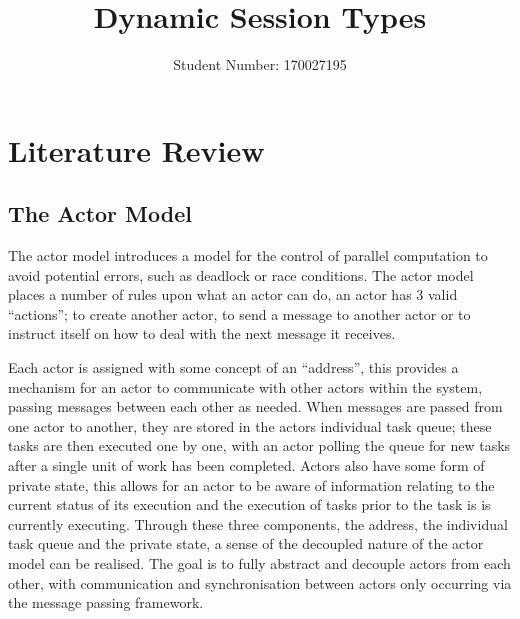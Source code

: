 \documentclass{article}
\author{Student Number: 170027195}
\title{Dynamic Session Types}
\begin{document}
	\maketitle
	\pagebreak
	\tableofcontents
	\pagebreak
	\section{Literature Review}
	\subsection{The Actor Model}
	The actor model introduces a model for the control of parallel computation to avoid potential errors, such as deadlock or race conditions. The actor model places a number of rules upon what an actor can do, an actor has 3 valid “actions”; to create another actor, to send a message to another actor or to instruct itself on how to deal with the next message it receives.
	
	Each actor is assigned with some concept of an “address”, this provides a mechanism for an actor to communicate with other actors within the system, passing messages between each other as needed. When messages are passed from one actor to another, they are stored in the actors individual task queue; these tasks are then executed one by one, with an actor polling the queue for new tasks after a single unit of work has been completed. Actors also have some form of private state, this allows for an actor to be aware of information relating to the current status of its execution and the execution of tasks prior to the task is is currently executing. Through these three components, the address, the individual task queue and the private state, a sense of the decoupled nature of the actor model can be realised. The goal is to fully abstract and decouple actors from each other, with communication and synchronisation between actors only occurring via the message passing framework.
	
\end{document}
